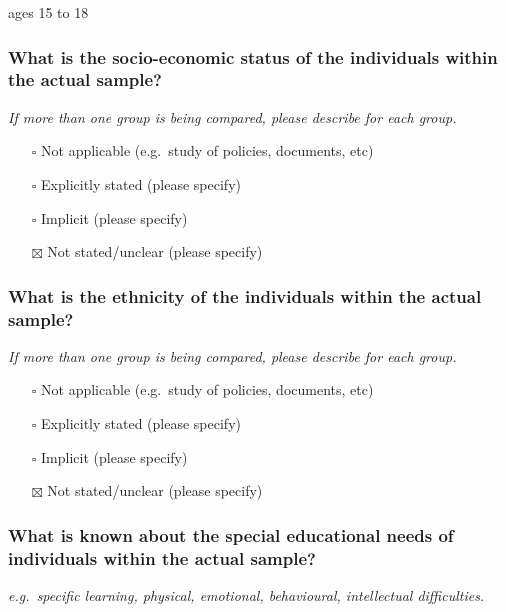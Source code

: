 \documentclass[
  doc, a4paper]{apa7}
\providecommand{\tightlist}{%
  \setlength{\itemsep}{0pt}\setlength{\parskip}{0pt}}
\begin{document}
ages 15 to 18

\subsubsection{What is the socio-economic status of the individuals within the actual sample?}\label{what-is-the-socio-economic-status-of-the-individuals-within-the-actual-sample}

\emph{If more than one group is being compared, please describe for each group.}

\begin{itemize}
\tightlist
\item[$\square$]
  Not applicable (e.g.~study of policies, documents, etc)
\item[$\square$]
  Explicitly stated (please specify)
\item[$\square$]
  Implicit (please specify)
\item[$\boxtimes$]
  Not stated/unclear (please specify)
\end{itemize}

\subsubsection{What is the ethnicity of the individuals within the actual sample?}\label{what-is-the-ethnicity-of-the-individuals-within-the-actual-sample}

\emph{If more than one group is being compared, please describe for each group.}

\begin{itemize}
\tightlist
\item[$\square$]
  Not applicable (e.g.~study of policies, documents, etc)
\item[$\square$]
  Explicitly stated (please specify)
\item[$\square$]
  Implicit (please specify)
\item[$\boxtimes$]
  Not stated/unclear (please specify)
\end{itemize}

\subsubsection{What is known about the special educational needs of individuals within the actual sample?}\label{what-is-known-about-the-special-educational-needs-of-individuals-within-the-actual-sample}

\emph{e.g.~specific learning, physical, emotional, behavioural, intellectual difficulties.}
\end{document}
